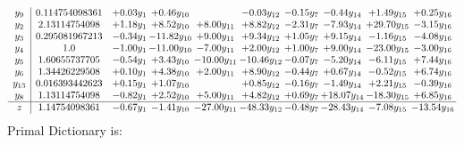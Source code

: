 \documentclass[9pt]{article}
\begin{document}
\[\begin{array}{c| c c@{\hskip 2pt} c@{\hskip 2pt} c@{\hskip 2pt} c@{\hskip 2pt} c@{\hskip 2pt} c@{\hskip 2pt} c@{\hskip 2pt} c@{\hskip 2pt} }
 y_{9}   &  0.114754098361 & +  0.03 y_{1} & +  0.46 y_{10} &   & -0.03 y_{12} & -0.15 y_{7} & -0.44 y_{14} & +  1.49 y_{15} & +  0.25 y_{16}\\
 y_{2}   &  2.13114754098 & +  1.18 y_{1} & +  8.52 y_{10} & +  8.00 y_{11} & +  8.82 y_{12} & -2.31 y_{7} & -7.93 y_{14} & + 29.70 y_{15} & -3.15 y_{16}\\
 y_{3}   &  0.295081967213 & -0.34 y_{1} & -11.82 y_{10} & +  9.00 y_{11} & +  9.34 y_{12} & +  1.05 y_{7} & +  9.15 y_{14} & -1.16 y_{15} & -4.08 y_{16}\\
 y_{4}   &  1.0 & -1.00 y_{1} & -11.00 y_{10} & -7.00 y_{11} & +  2.00 y_{12} & +  1.00 y_{7} & +  9.00 y_{14} & -23.00 y_{15} & -3.00 y_{16}\\
 y_{5}   &  1.60655737705 & -0.54 y_{1} & +  3.43 y_{10} & -10.00 y_{11} & -10.46 y_{12} & -0.07 y_{7} & -5.20 y_{14} & -6.11 y_{15} & +  7.44 y_{16}\\
 y_{6}   &  1.34426229508 & +  0.10 y_{1} & +  4.38 y_{10} & +  2.00 y_{11} & +  8.90 y_{12} & -0.44 y_{7} & +  0.67 y_{14} & -0.52 y_{15} & +  6.74 y_{16}\\
 y_{13}   &  0.016393442623 & +  0.15 y_{1} & +  1.07 y_{10} &   & +  0.85 y_{12} & -0.16 y_{7} & -1.49 y_{14} & +  2.21 y_{15} & -0.39 y_{16}\\
 y_{8}   &  1.13114754098 & -0.82 y_{1} & +  2.52 y_{10} & +  5.00 y_{11} & +  4.82 y_{12} & +  0.69 y_{7} & + 18.07 y_{14} & -18.30 y_{15} & +  6.85 y_{16}\\
\hline
z    &  1.14754098361 & -0.67 y_{1} & -1.41 y_{10} & -27.00 y_{11} & -48.33 y_{12} & -0.48 y_{7} & -28.43 y_{14} & -7.08 y_{15} & -13.54 y_{16}\\
\end{array}\]
Primal Dictionary is:
\end{document}
